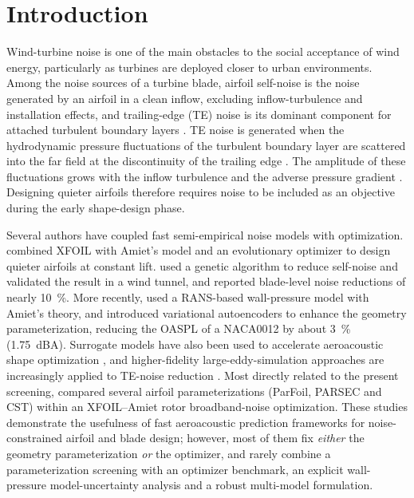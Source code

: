 \documentclass[preprint,3p,times]{elsarticle}
\begin{document}
\section{Introduction}
Wind-turbine noise is one of the main obstacles to the social acceptance of
wind energy, particularly as turbines are deployed closer to urban
environments. Among the noise sources of a turbine blade, airfoil self-noise
\citep{BrooksPopeMarcolini1989} is the noise generated by an airfoil in a clean
inflow, excluding inflow-turbulence and installation effects, and trailing-edge
(TE) noise is its dominant component for attached turbulent boundary layers
\citep{RogerMoreau2005,Lee2021}. TE noise is
generated when the hydrodynamic pressure fluctuations of the turbulent boundary
layer are scattered into the far field at the discontinuity of the trailing
edge \citep{Lee2021}. The amplitude of these fluctuations grows with the inflow
turbulence and the adverse pressure gradient \citep{Botero2021}. Designing quieter airfoils therefore requires noise to be included as an
objective during the early shape-design phase.

Several authors have coupled fast semi-empirical noise models with optimization.
\citet{VolkmerCarolus2018} combined XFOIL with Amiet's model and an
evolutionary optimizer to design quieter airfoils at constant lift.
\citet{Lee2013} used a genetic algorithm to reduce self-noise and validated the
result in a wind tunnel, and \citet{RodriguesMarta2014} reported blade-level
noise reductions of nearly \SI{10}{\percent}. More recently,
\citet{Ricks2020} used a RANS-based wall-pressure model with Amiet's theory,
and \citet{Kou2023} introduced variational autoencoders to enhance the geometry
parameterization, reducing the OASPL of a NACA0012 by about \SI{3}{\percent}
(\SI{1.75}{dBA}). Surrogate models have also been used to accelerate aeroacoustic shape
optimization \citep{Leifsson2015}, and higher-fidelity large-eddy-simulation
approaches are increasingly applied to TE-noise reduction \citep{Luo2025}. Most
directly related to the present screening, \citet{WonLee2024} compared several
airfoil parameterizations (ParFoil, PARSEC and CST) within an XFOIL--Amiet
rotor broadband-noise optimization. These
studies demonstrate the usefulness of fast aeroacoustic prediction frameworks for
noise-constrained airfoil and blade design; however, most of them fix
\emph{either} the geometry parameterization \emph{or} the optimizer, and rarely
combine a parameterization screening with an optimizer benchmark, an explicit
wall-pressure model-uncertainty analysis and a robust multi-model formulation.
\end{document}

